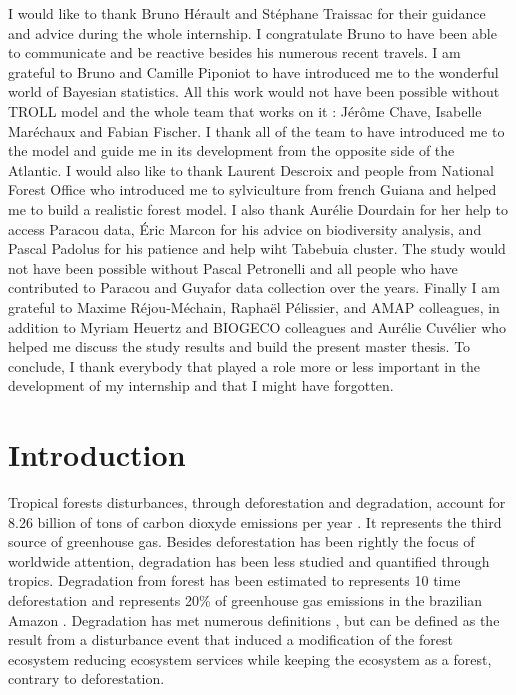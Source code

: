 \documentclass[12pt,]{article}
\let\oldsection\section
\renewcommand\section{\newpage\oldsection}
\theoremstyle{definition}
\theoremstyle{definition}
\theoremstyle{remark}
\begin{document}
I would like to thank Bruno Hérault and Stéphane Traissac for their
guidance and advice during the whole internship. I congratulate Bruno to
have been able to communicate and be reactive besides his numerous
recent travels. I am grateful to Bruno and Camille Piponiot to have
introduced me to the wonderful world of Bayesian statistics. All this
work would not have been possible without TROLL model and the whole team
that works on it : Jérôme Chave, Isabelle Maréchaux and Fabian Fischer.
I thank all of the team to have introduced me to the model and guide me
in its development from the opposite side of the Atlantic. I would also
like to thank Laurent Descroix and people from National Forest Office
who introduced me to sylviculture from french Guiana and helped me to
build a realistic forest model. I also thank Aurélie Dourdain for her
help to access Paracou data, Éric Marcon for his advice on biodiversity
analysis, and Pascal Padolus for his patience and help wiht Tabebuia
cluster. The study would not have been possible without Pascal
Petronelli and all people who have contributed to Paracou and Guyafor
data collection over the years. Finally I am grateful to Maxime
Réjou-Méchain, Raphaël Pélissier, and AMAP colleagues, in addition to
Myriam Heuertz and BIOGECO colleagues and Aurélie Cuvélier who helped me
discuss the study results and build the present master thesis. To
conclude, I thank everybody that played a role more or less important in
the development of my internship and that I might have forgotten.

\section*{Introduction}\label{introduction}

Tropical forests disturbances, through deforestation and degradation,
account for 8.26 billion of tons of carbon dioxyde emissions per year
\citep{Pearson2017}. It represents the third source of greenhouse gas.
Besides deforestation has been rightly the focus of worldwide attention,
degradation has been less studied and quantified through tropics.
Degradation from forest has been estimated to represents 10 time
deforestation \citep{Herold2011} and represents 20\% of greenhouse gas
emissions in the brazilian Amazon \citep{Asner2005}. Degradation has met
numerous definitions \citep{Simula2009}, but can be defined as the
result from a disturbance event that induced a modification of the
forest ecosystem reducing ecosystem services while keeping the ecosystem
as a forest, contrary to deforestation.
\end{document}
